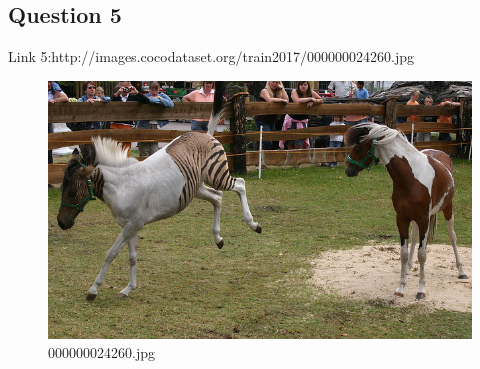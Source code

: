 \subsection{Question 5}
Link 5:http://images.cocodataset.org/train2017/000000024260.jpg
    \begin{figure}[h]
        \centering
        \includegraphics[width=0.8\linewidth]{../image set/easy/000000024260.jpg}
        \caption{000000024260.jpg}
    \end{figure}
